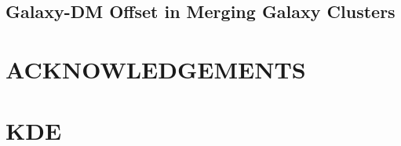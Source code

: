 \documentclass[letterpaper,useAMS,usenatbib]{mn2e}
\begin{document}
\subsection{Galaxy-DM Offset in Merging Galaxy Clusters}
\section{ACKNOWLEDGEMENTS}



\appendix
\section{KDE}
\clearpage\bsp\label{lastpage} 
\end{document}
